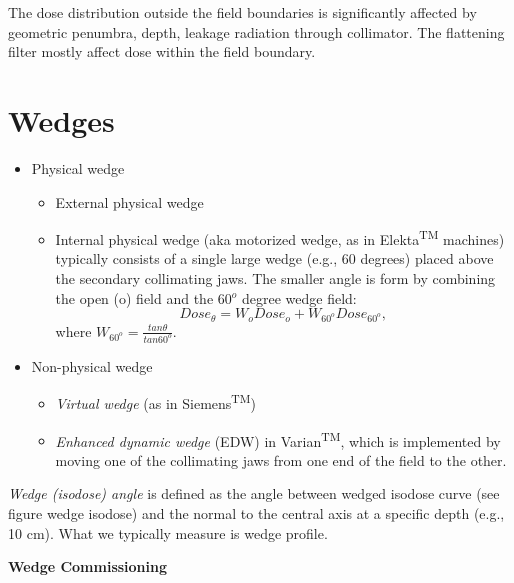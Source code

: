 \documentclass[]{book}
\providecommand{\tightlist}{%
  \setlength{\itemsep}{0pt}\setlength{\parskip}{0pt}}
\theoremstyle{definition}
\theoremstyle{definition}
\theoremstyle{definition}
\theoremstyle{remark}
\begin{document}
The dose distribution outside the field boundaries is significantly
affected by geometric penumbra, depth, leakage radiation through
collimator. The flattening filter mostly affect dose within the field
boundary.

\section{Wedges}\label{wedges}

\begin{itemize}
\tightlist
\item
  Physical wedge

  \begin{itemize}
  \tightlist
  \item
    External physical wedge
  \item
    Internal physical wedge (aka motorized wedge, as in
    Elekta\textsuperscript{TM} machines) typically consists of a single
    large wedge (e.g., 60 degrees) placed above the secondary
    collimating jaws. The smaller angle is form by combining the open
    (o) field and the 60\(^o\) degree wedge field:
    \[ Dose_{\theta}=W_{o}Dose_{o} + W_{60^o}Dose_{60^o},\] where
    \(W_{60^o}=\frac{tan\theta}{tan{60^o}}\).
  \end{itemize}
\item
  Non-physical wedge

  \begin{itemize}
  \tightlist
  \item
    \emph{Virtual wedge} (as in Siemens\textsuperscript{TM})
  \item
    \emph{Enhanced dynamic wedge} (EDW) in Varian\textsuperscript{TM},
    which is implemented by moving one of the collimating jaws from one
    end of the field to the other.
  \end{itemize}
\end{itemize}

\emph{Wedge (isodose) angle} is defined as the angle between wedged
isodose curve (see figure wedge isodose) and the normal to the central
axis at a specific depth (e.g., 10 cm). What we typically measure is
wedge profile.

\textbf{Wedge Commissioning}
\end{document}

